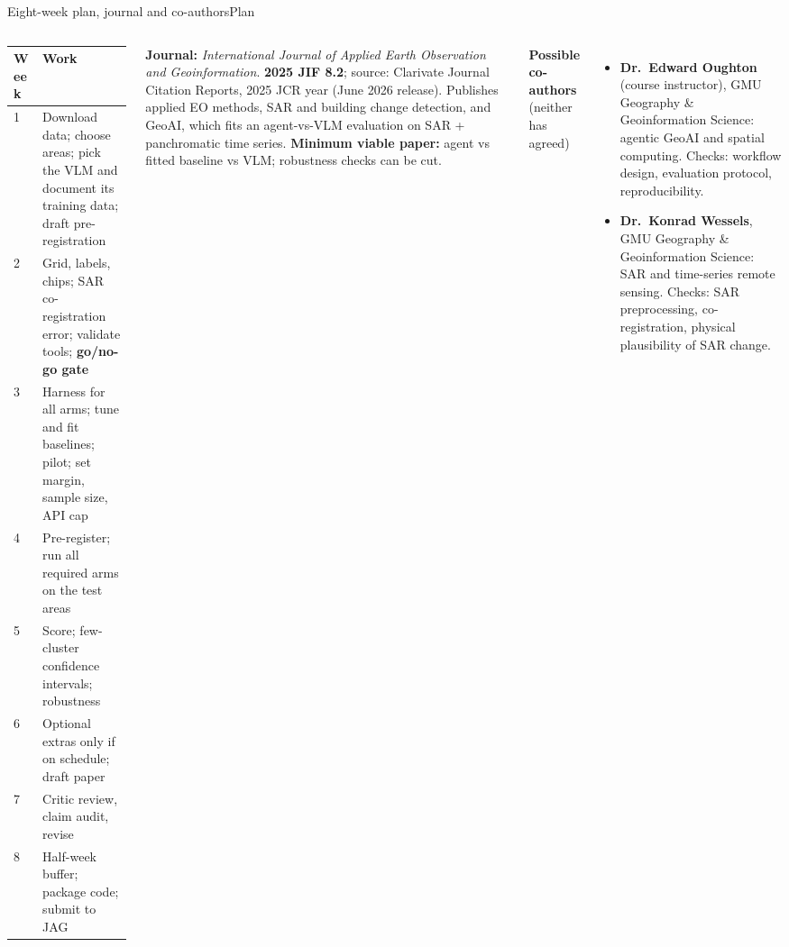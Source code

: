 \documentclass[aspectratio=169,11pt]{beamer}
\begin{document}
\begin{frame}[shrink=20]{Eight-week plan, journal and co-authors}{Plan}
\begin{columns}[T,onlytextwidth]
\scriptsize
\begin{tabular}{@{}lp{5.6cm}@{}}
\toprule
\textbf{Week} & \textbf{Work} \\
\midrule
1 & Download data; choose areas; pick the VLM and document its training data; draft pre-registration \\
2 & Grid, labels, chips; SAR co-registration error; validate tools; \textbf{go/no-go gate} \\
3 & Harness for all arms; tune and fit baselines; pilot; set margin, sample size, API cap \\
4 & Pre-register; run all required arms on the test areas \\
5 & Score; few-cluster confidence intervals; robustness \\
6 & Optional extras only if on schedule; draft paper \\
7 & Critic review, claim audit, revise \\
8 & Half-week buffer; package code; submit to JAG \\
\bottomrule
\end{tabular}
{\footnotesize\textbf{Journal:} \emph{International Journal of Applied Earth Observation and Geoinformation}. \textbf{2025 JIF 8.2}; source: Clarivate Journal Citation Reports, 2025 JCR year (June 2026 release). Publishes applied EO methods, SAR and building change detection, and GeoAI, which fits an agent-vs-VLM evaluation on SAR + panchromatic time series.}
\vspace{6pt}
{\scriptsize\textbf{Minimum viable paper:} agent vs fitted baseline vs VLM; robustness checks can be cut.}\par\textbf{Possible co-authors} {\scriptsize(neither has agreed)}
\begin{itemize}\scriptsize
  \item \textbf{Dr.\ Edward Oughton} (course instructor), GMU Geography \& Geoinformation Science: agentic GeoAI and spatial computing. Checks: workflow design, evaluation protocol, reproducibility.
  \item \textbf{Dr.\ Konrad Wessels}, GMU Geography \& Geoinformation Science: SAR and time-series remote sensing. Checks: SAR preprocessing, co-registration, physical plausibility of SAR change.
\end{itemize}
\end{columns}
\end{frame}
\end{document}
